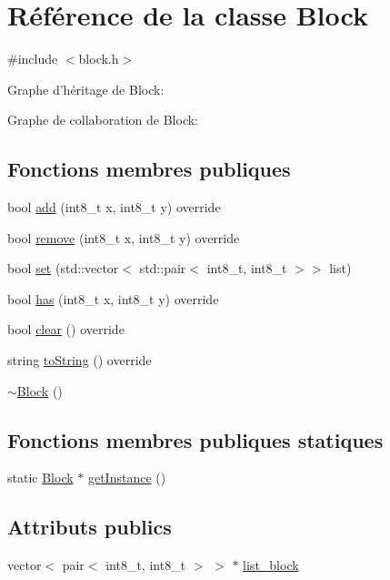 \hypertarget{class_block}{\section{Référence de la classe Block}
\label{class_block}
}


{\ttfamily \#include $<$block.\-h$>$}



Graphe d'héritage de Block\-:


Graphe de collaboration de Block\-:
\subsection*{Fonctions membres publiques}
\begin{DoxyCompactItemize}
\item 
bool \hyperlink{class_block_aed3bcda97836cd92c2856e5c5e06e883}{add} (int8\-\_\-t x, int8\-\_\-t y) override
\item 
bool \hyperlink{class_block_a51b901e4a8b6ad9b7dca8a7a0dee5180}{remove} (int8\-\_\-t x, int8\-\_\-t y) override
\item 
bool \hyperlink{class_block_a0876bcd3bdb4e627de3e78faa31163c5}{set} (std\-::vector$<$ std\-::pair$<$ int8\-\_\-t, int8\-\_\-t $>$$>$ list)
\item 
bool \hyperlink{class_block_a3932c46f03bf956c2ae094b96eab67d3}{has} (int8\-\_\-t x, int8\-\_\-t y) override
\item 
bool \hyperlink{class_block_a37bf8cd7e85de983bc56eb19b168575a}{clear} () override
\item 
string \hyperlink{class_block_a012fdf4452ee116b61948e7cdf0475ca}{to\-String} () override
\item 
\hyperlink{class_block_a19d1bd0e1cef6a865ed2745a2e648405}{$\sim$\-Block} ()
\end{DoxyCompactItemize}
\subsection*{Fonctions membres publiques statiques}
\begin{DoxyCompactItemize}
\item 
static \hyperlink{class_block}{Block} $\ast$ \hyperlink{class_block_a2cf0004e7ab0f92b52bca2ebf8a1d52c}{get\-Instance} ()
\end{DoxyCompactItemize}
\subsection*{Attributs publics}
\begin{DoxyCompactItemize}
\item 
vector$<$ pair$<$ int8\-\_\-t, int8\-\_\-t $>$ $>$ $\ast$ \hyperlink{class_block_a45c3e71b45b9ef6364eac9354563aedd}{list\-\_\-block}
\end{DoxyCompactItemize}
